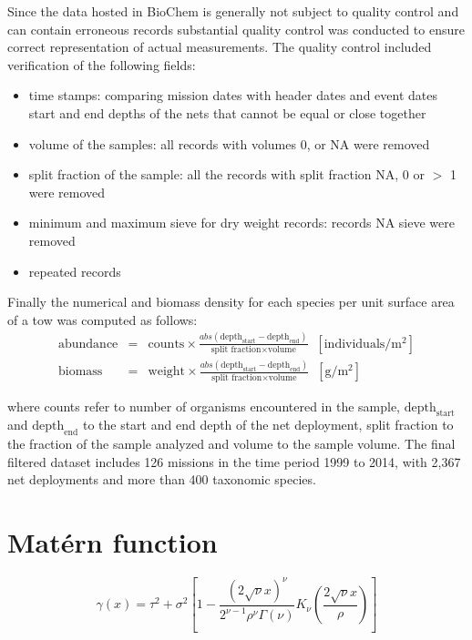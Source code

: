\documentclass[letterpaper,portrait,11pt]{scrartcl}
\numberwithin{equation}{section}		%
\numberwithin{figure}{section}		%
\numberwithin{table}{section}				%
\begin{document}
\begin{appendices}
Since the data hosted in BioChem is generally not subject to quality control and can contain erroneous records substantial quality control was conducted to ensure correct representation of actual measurements. The quality control included verification of the following fields: 

\begin{itemize}
  \item time stamps: comparing mission dates with header dates and event dates 
  start and end depths of the nets that cannot be equal or close together
  \item volume of the samples: all records with volumes 0, or NA were removed
  \item split fraction of the sample: all the records with split fraction NA, 0 or $>$ 1 were removed 
  \item minimum and maximum sieve for dry weight records: records NA sieve were removed
  \item repeated records 
\end{itemize}


Finally the numerical and biomass density for each species per unit surface area of a tow was computed as follows: 
\begin{eqnarray*}
\text{abundance} &=& \text{counts} \times \frac{  abs( \text{depth}_{\text{start}} - \text{depth}_{\text{end}} ) } { \text{split fraction} \times \text{volume} } \; \; [\text{individuals}/ \text{m}^{2} ]  \\
\text{biomass} &=& \text{weight} \times \frac{ abs( \text{depth}_{\text{start}} - \text{depth}_{\text{end}} )} { \text{split fraction} \times \text{volume}} \; \; [\text{g}/\text{m}^2]
\end{eqnarray*}

where counts refer to number of organisms encountered in the sample, $\text{depth}_{\text{start}}$ and $\text{depth}_{\text{end}}$ to the start and end depth of the net deployment, split fraction to the fraction of the sample analyzed and volume to the sample volume. The final filtered dataset includes 126 missions in the time period 1999 to 2014, with 2,367 net deployments and more than 400 taxonomic species. 


\section{Mat\'{e}rn function}

\begin{equation}
\gamma(x) = \tau^2 + \sigma^2 [ 1 - \frac{{(2\sqrt{\nu}x)}^\nu}{2^{\nu-1} \rho^{\nu} \Gamma(\nu)}
K_\nu(\frac{2\sqrt{\nu}x}{\rho} ) ]
\end{equation}


\end{appendices}
\end{document}
